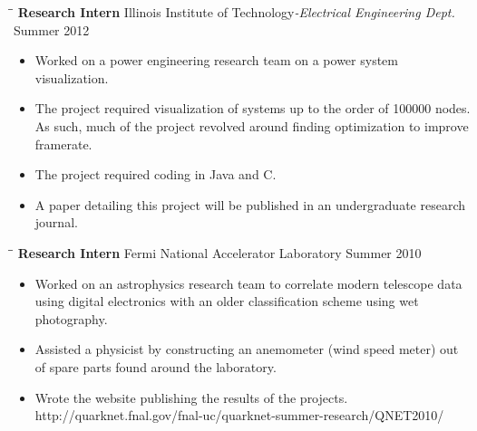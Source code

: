 \documentclass{res}
\begin{document}
\begin{resume}
   \begin{tabbing}
   \hspace{1.3in}\= \hspace{3.6in}\= \kill %
    {\bf Research Intern} \>Illinois Institute of Technology\emph{\small{-Electrical Engineering Dept.}} \>Summer 2012\\
   \end{tabbing}\vspace{-20pt}
   \begin{itemize}
     \item Worked on a power engineering research team on a power system visualization. 
     \item The project required visualization of systems up to the order of 100000 nodes. As such, much of the project revolved around finding optimization to improve framerate.
     \item The project required coding in Java and C.
     \item A paper detailing this project will be published in an undergraduate research journal.
   \end{itemize}

   \begin{tabbing}
   \hspace{2.3in}\= \hspace{2.6in}\= \kill %
    {\bf Research Intern} \>Fermi National Accelerator Laboratory     \>Summer 2010\\
   \end{tabbing}\vspace{-20pt}      %
   \begin{itemize}
      \item Worked on an astrophysics research team to correlate modern telescope data using digital electronics with an older classification scheme using wet photography.
      \item Assisted a physicist by constructing an anemometer (wind speed meter) out of spare parts found around the laboratory.
      \item Wrote the website publishing the results of the projects.\\ http://quarknet.fnal.gov/fnal-uc/quarknet-summer-research/QNET2010/
   \end{itemize}


\end{resume}
\end{document}
